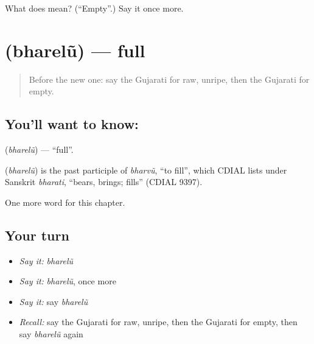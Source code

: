 \begin{tcolorbox}[breakable,colback=teal!4,colframe=teal!35!black,title={Before you move on}]
What does  mean? (\textquotedblleft{}Empty\textquotedblright{}.) Say it once more.
\end{tcolorbox}
\section[\texorpdfstring{\gu{ભરેલું} (bharelũ)}{ભરેલું (bharelũ)}]{ (bharelũ) — full}

\label{lesson:GU-C136-bharelu}



\begin{quote}
Before the new one: say the Gujarati for raw, unripe, then the Gujarati for empty.
\end{quote}

\subsection*{You'll want to know: }
\textbf{} (\emph{bharelũ}) — \textquotedblleft{}full\textquotedblright{}.

\begin{cousinweb}
\textbf{} (\emph{bharelũ}) is the past participle of \emph{bharvũ}, \textquotedblleft{}to fill\textquotedblright{}, which CDIAL lists under Sanskrit \emph{bharati}, \textquotedblleft{}bears, brings; fills\textquotedblright{} (CDIAL 9397).
\end{cousinweb}

\begin{grammarlens}[title={What you've built}]
One more word for this chapter.
\end{grammarlens}

\subsection*{Your turn}
\begin{itemize}
\raggedright
  \item \emph{Say it:} \emph{bharelũ}
  \item \emph{Say it:} \emph{bharelũ}, once more
  \item \emph{Say it:} say \emph{bharelũ}
  \item \emph{Recall:} say the Gujarati for raw, unripe, then the Gujarati for empty, then say \emph{bharelũ} again
\end{itemize}

